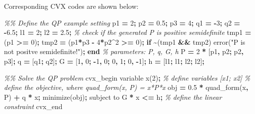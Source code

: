 \documentclass[
]{book}
\newenvironment{Shaded}{\begin{snugshade}}{\end{snugshade}}
\newcommand{\CommentTok}[1]{\textcolor[rgb]{0.56,0.35,0.01}{\textit{#1}}}
\newcommand{\FloatTok}[1]{\textcolor[rgb]{0.00,0.00,0.81}{#1}}
\newcommand{\KeywordTok}[1]{\textcolor[rgb]{0.13,0.29,0.53}{\textbf{#1}}}
\newcommand{\NormalTok}[1]{#1}
\newcommand{\OperatorTok}[1]{\textcolor[rgb]{0.81,0.36,0.00}{\textbf{#1}}}
\newcommand{\StringTok}[1]{\textcolor[rgb]{0.31,0.60,0.02}{#1}}
\newcommand{\VariableTok}[1]{\textcolor[rgb]{0.00,0.00,0.00}{#1}}
\theoremstyle{definition}
\theoremstyle{definition}
\theoremstyle{definition}
\theoremstyle{definition}
\theoremstyle{remark}
\begin{document}
Corresponding CVX codes are shown below:

\begin{Shaded}
\begin{Highlighting}[]
\CommentTok{\%\% Define the QP example setting}
\VariableTok{p1} \OperatorTok{=} \FloatTok{2}\OperatorTok{;}
\VariableTok{p2} \OperatorTok{=} \FloatTok{0.5}\OperatorTok{;}
\VariableTok{p3} \OperatorTok{=} \FloatTok{4}\OperatorTok{;}
\VariableTok{q1} \OperatorTok{=} \OperatorTok{{-}}\FloatTok{3}\OperatorTok{;}
\VariableTok{q2} \OperatorTok{=} \OperatorTok{{-}}\FloatTok{6.5}\OperatorTok{;}
\VariableTok{l1} \OperatorTok{=} \FloatTok{2}\OperatorTok{;}
\VariableTok{l2} \OperatorTok{=} \FloatTok{2.5}\OperatorTok{;}
\CommentTok{\% check if the generated P is positive semidefinite}
\VariableTok{tmp1} \OperatorTok{=}\NormalTok{ (}\VariableTok{p1} \OperatorTok{\textgreater{}=} \FloatTok{0}\NormalTok{)}\OperatorTok{;}
\VariableTok{tmp2} \OperatorTok{=}\NormalTok{ (}\VariableTok{p1}\OperatorTok{*}\VariableTok{p3} \OperatorTok{{-}} \FloatTok{4}\OperatorTok{*}\VariableTok{p2}\OperatorTok{\^{}}\FloatTok{2} \OperatorTok{\textgreater{}=} \FloatTok{0}\NormalTok{)}\OperatorTok{;}
\KeywordTok{if} \OperatorTok{\textasciitilde{}}\NormalTok{(}\VariableTok{tmp1} \OperatorTok{\&\&} \VariableTok{tmp2}\NormalTok{)}
    \VariableTok{error}\NormalTok{(}\StringTok{"P is not positve semidefinite!"}\NormalTok{)}\OperatorTok{;}
\KeywordTok{end}
\CommentTok{\% parameters: P, q, G, h}
\VariableTok{P} \OperatorTok{=} \FloatTok{2} \OperatorTok{*}\NormalTok{ [}\VariableTok{p1}\OperatorTok{,} \VariableTok{p2}\OperatorTok{;} \VariableTok{p2}\OperatorTok{,} \VariableTok{p3}\NormalTok{]}\OperatorTok{;}
\VariableTok{q} \OperatorTok{=}\NormalTok{ [}\VariableTok{q1}\OperatorTok{;} \VariableTok{q2}\NormalTok{]}\OperatorTok{;}
\VariableTok{G} \OperatorTok{=}\NormalTok{ [}\FloatTok{1}\OperatorTok{,} \FloatTok{0}\OperatorTok{;} \OperatorTok{{-}}\FloatTok{1}\OperatorTok{,} \FloatTok{0}\OperatorTok{;} \FloatTok{0}\OperatorTok{,} \FloatTok{1}\OperatorTok{;} \FloatTok{0}\OperatorTok{,} \OperatorTok{{-}}\FloatTok{1}\NormalTok{]}\OperatorTok{;}
\VariableTok{h} \OperatorTok{=}\NormalTok{ [}\VariableTok{l1}\OperatorTok{;} \VariableTok{l1}\OperatorTok{;} \VariableTok{l2}\OperatorTok{;} \VariableTok{l2}\NormalTok{]}\OperatorTok{;}

\CommentTok{\%\% Solve the QP problem}
\VariableTok{cvx\_begin}
    \VariableTok{variable} \VariableTok{x}\NormalTok{(}\FloatTok{2}\NormalTok{)}\OperatorTok{;} \CommentTok{\% define variables [x1; x2]}
    \CommentTok{\% define the objective, where quad\_form(x, P) = x\textquotesingle{}*P*x}
    \VariableTok{obj} \OperatorTok{=} \FloatTok{0.5} \OperatorTok{*} \VariableTok{quad\_form}\NormalTok{(}\VariableTok{x}\OperatorTok{,} \VariableTok{P}\NormalTok{) }\OperatorTok{+} \VariableTok{q}\OperatorTok{\textquotesingle{}} \OperatorTok{*} \VariableTok{x}\OperatorTok{;} 
    \VariableTok{minimize}\NormalTok{(}\VariableTok{obj}\NormalTok{)}\OperatorTok{;} 
    \VariableTok{subject} \VariableTok{to}
        \VariableTok{G} \OperatorTok{*} \VariableTok{x} \OperatorTok{\textless{}=} \VariableTok{h}\OperatorTok{;} \CommentTok{\% define the linear constraint}
\VariableTok{cvx\_end}
\end{Highlighting}
\end{Shaded}
\end{document}
